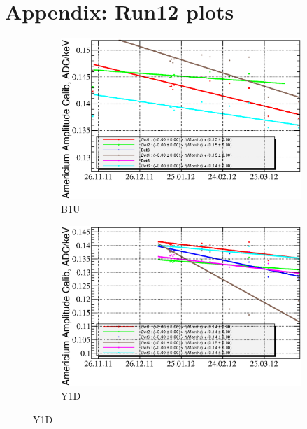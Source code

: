 \documentclass[a4paper,12pt]{article}
\begin{document}
\clearpage
\appendix
\section{Appendix: Run12 plots}
\label{sec:appendix_run12}

\begin{figure}[htb]
\begin{subfigure}[t]{0.49\textwidth}
\includegraphics[width=\textwidth]{gfx/run12_alpha/B1U/c_chAmGain_by_day_B1U.eps}
\caption{B1U}
\end{subfigure}
%
\hfill
%
\begin{subfigure}[t]{0.49\textwidth}
\includegraphics[width=\textwidth]{gfx/run12_alpha/Y1D/c_chAmGain_by_day_Y1D.eps}
\caption{Y1D}
\end{subfigure}


\end{figure}
\end{document}
